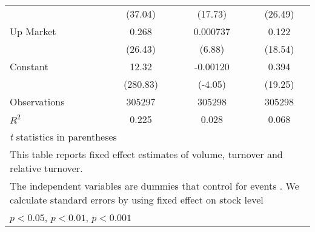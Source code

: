{\begin{tabular}{l*{3}{c}}
                    &     (37.04)         &     (17.73)         &     (26.49)         \\
[1em]
Up Market           &       0.268\sym{***}&    0.000737\sym{***}&       0.122\sym{***}\\
                    &     (26.43)         &      (6.88)         &     (18.54)         \\
[1em]
Constant            &       12.32\sym{***}&    -0.00120\sym{***}&       0.394\sym{***}\\
                    &    (280.83)         &     (-4.05)         &     (19.25)         \\
\hline
Observations        &      305297         &      305298         &      305298         \\
\(R^{2}\)           &       0.225         &       0.028         &       0.068         \\
\hline\hline
\multicolumn{4}{l}{\footnotesize \textit{t} statistics in parentheses}\\
\multicolumn{4}{l}{\footnotesize This table reports fixed effect estimates of volume, turnover and relative turnover.}\\
\multicolumn{4}{l}{\footnotesize The independent variables are dummies that control for events . We calculate standard errors by using fixed effect on stock level}\\
\multicolumn{4}{l}{\footnotesize \sym{*} \(p<0.05\), \sym{**} \(p<0.01\), \sym{***} \(p<0.001\)}\\
\end{tabular}
}
